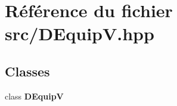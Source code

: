 \section{Référence du fichier src/\-D\-Equip\-V.hpp}
\label{_d_equip_v_8hpp}
\subsection*{Classes}
\begin{DoxyCompactItemize}
\item 
class {\bf D\-Equip\-V}
\end{DoxyCompactItemize}
